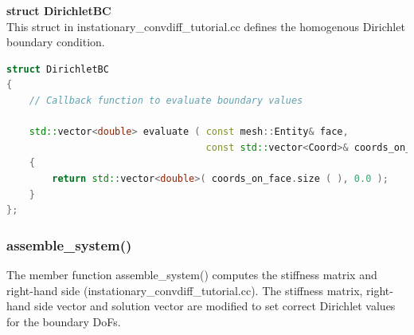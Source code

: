 \documentclass[a4paper, 11pt, twoside]{article}
\begin{document}
\textbf{struct DirichletBC} \label{structDirichletBC}\\
This struct in instationary\_convdiff\_tutorial.cc defines the homogenous Dirichlet boundary condition.
\begin{lstlisting}[language=C++, basicstyle={\footnotesize, \ttfamily}, keywordstyle=\color{blue}, numbers=none, tabsize=4]
struct DirichletBC
{
    // Callback function to evaluate boundary values

    std::vector<double> evaluate ( const mesh::Entity& face,
                                   const std::vector<Coord>& coords_on_face ) const
    {
        return std::vector<double>( coords_on_face.size ( ), 0.0 );
    }
};
\end{lstlisting}

\subsubsection{assemble\_system()}\label{sec:assemble}
The member function assemble\_system() computes the stiffness matrix and right-hand side (instationary\_convdiff\_tutorial.cc). The stiffness matrix, right-hand side vector and solution vector are modified to set correct Dirichlet values for the boundary DoFs.
\end{document}
